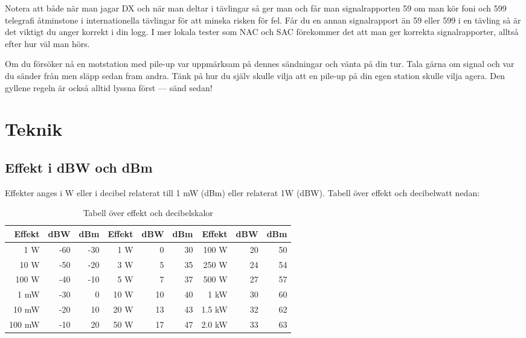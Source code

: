 Notera att både när man jagar DX och när man deltar i tävlingar så ger man och får man signalrapporten 59 om man kör foni och 599 telegrafi åtminstone i internationella tävlingar för att minska risken för fel. Får du en annan signalrapport än 59 eller 599 i en tävling så är det viktigt du anger korrekt i din logg. I mer lokala tester som NAC och SAC förekommer det att man ger korrekta signalrapporter, alltså efter hur väl man hörs.

Om du försöker nå en motstation med pile-up var uppmärksam på dennes sändningar och vänta på din tur. Tala gärna om signal och var du sänder från men släpp sedan fram andra. Tänk på hur du själv skulle vilja att en pile-up på din egen station skulle vilja agera. Den gyllene regeln är också alltid lyssna först --- sänd sedan!


\newpage

\section{Teknik}

\subsection{Effekt i dBW och dBm}

Effekter anges i W eller i decibel relaterat till 1 mW (dBm) eller relaterat
1W (dBW). Tabell över effekt och decibelwatt nedan:
\begin{table}[H]
\centering
\begin{tabular}{rrr|rrr|rrr}
	\textbf{Effekt} & \textbf{dBW} & \textbf{dBm} & \textbf{Effekt} & \textbf{dBW} & \textbf{dBm} & \textbf{Effekt} & \textbf{dBW} & \textbf{dBm} \\ \hline
	    1 \textmu W &          -60 &          -30 &             1 W &            0 &           30 &           100 W &           20 &           50 \\
	   10 \textmu W &          -50 &          -20 &             3 W &            5 &           35 &           250 W &           24 &           54 \\
	  100 \textmu W &          -40 &          -10 &             5 W &            7 &           37 &           500 W &           27 &           57 \\
	           1 mW &          -30 &            0 &            10 W &           10 &           40 &            1 kW &           30 &           60 \\
	          10 mW &          -20 &           10 &            20 W &           13 &           43 &          1.5 kW &           32 &           62 \\
	         100 mW &          -10 &           20 &            50 W &           17 &           47 &          2.0 kW &           33 &           63
\end{tabular}
\caption{Tabell över effekt och decibelskalor}
\end{table}

